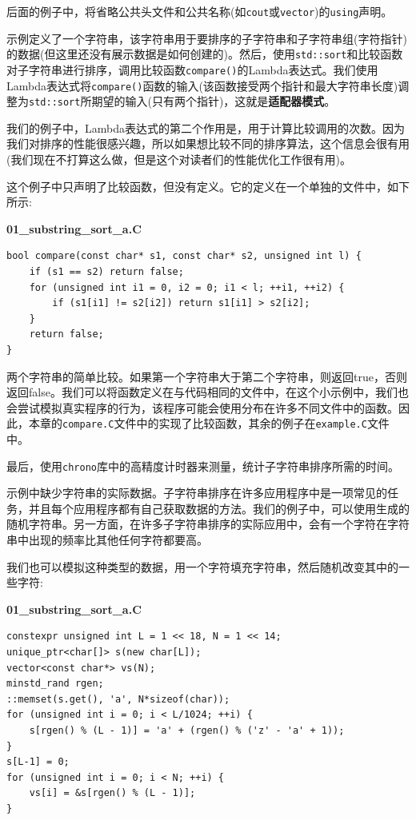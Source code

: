 后面的例子中，将省略公共头文件和公共名称(如\texttt{cout}或\texttt{vector})的\texttt{using}声明。

示例定义了一个字符串，该字符串用于要排序的子字符串和子字符串组(字符指针)的数据(但这里还没有展示数据是如何创建的)。然后，使用\texttt{std::sort}和比较函数对子字符串进行排序，调用比较函数\texttt{compare()}的Lambda表达式。我们使用Lambda表达式将\texttt{compare()}函数的输入(该函数接受两个指针和最大字符串长度)调整为\texttt{std::sort}所期望的输入(只有两个指针)，这就是\textbf{适配器模式}。

我们的例子中，Lambda表达式的第二个作用是，用于计算比较调用的次数。因为我们对排序的性能很感兴趣，所以如果想比较不同的排序算法，这个信息会很有用(我们现在不打算这么做，但是这个对读者们的性能优化工作很有用)。

这个例子中只声明了比较函数，但没有定义。它的定义在一个单独的文件中，如下所示:


\noindent
\textbf{01\_substring\_sort\_a.C}
\begin{lstlisting}[style=styleCXX]
bool compare(const char* s1, const char* s2, unsigned int l) {
	if (s1 == s2) return false;
	for (unsigned int i1 = 0, i2 = 0; i1 < l; ++i1, ++i2) {
		if (s1[i1] != s2[i2]) return s1[i1] > s2[i2];
	}
	return false;
}
\end{lstlisting}

两个字符串的简单比较。如果第一个字符串大于第二个字符串，则返回true，否则返回false。我们可以将函数定义在与代码相同的文件中，在这个小示例中，我们也会尝试模拟真实程序的行为，该程序可能会使用分布在许多不同文件中的函数。因此，本章的\texttt{compare.C}文件中的实现了比较函数，其余的例子在\texttt{example.C}文件中。

最后，使用\texttt{chrono}库中的高精度计时器来测量，统计子字符串排序所需的时间。

示例中缺少字符串的实际数据。子字符串排序在许多应用程序中是一项常见的任务，并且每个应用程序都有自己获取数据的方法。我们的例子中，可以使用生成的随机字符串。另一方面，在许多子字符串排序的实际应用中，会有一个字符在字符串中出现的频率比其他任何字符都要高。

我们也可以模拟这种类型的数据，用一个字符填充字符串，然后随机改变其中的一些字符:

\noindent
\textbf{01\_substring\_sort\_a.C}
\begin{lstlisting}[style=styleCXX]
constexpr unsigned int L = 1 << 18, N = 1 << 14;
unique_ptr<char[]> s(new char[L]);
vector<const char*> vs(N);
minstd_rand rgen;
::memset(s.get(), 'a', N*sizeof(char));
for (unsigned int i = 0; i < L/1024; ++i) {
	s[rgen() % (L - 1)] = 'a' + (rgen() % ('z' - 'a' + 1));
}
s[L-1] = 0;
for (unsigned int i = 0; i < N; ++i) {
	vs[i] = &s[rgen() % (L - 1)];
}
\end{lstlisting}

